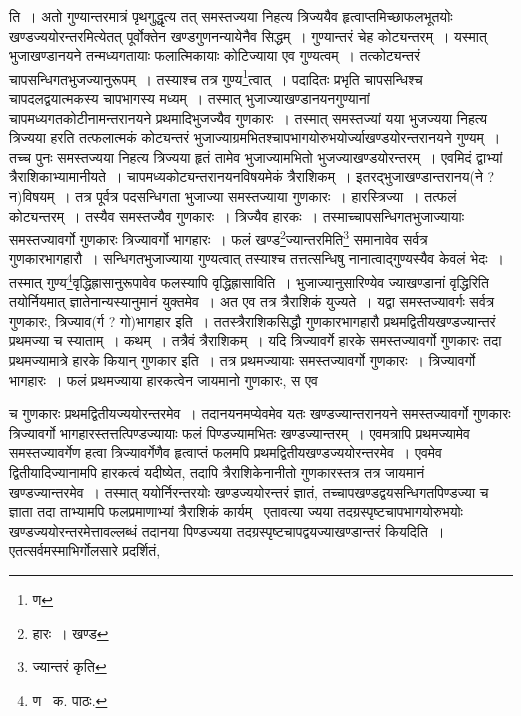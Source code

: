 \documentclass[11pt, openany]{book}
\begin{document}
ति~। अतो गुण्यान्तरमात्रं पृथगुद्धृत्य तत् समस्तज्यया निहत्य त्रिज्ययैव हृत्वाप्तमिच्छाफलभूतयोः खण्डज्ययोरन्तरमित्येतत् पूर्वोक्तेन खण्डगुणनन्यायेनैव सिद्धम्~। गुण्यान्तरं चेह कोट्यन्तरम्~। यस्मात् भुजाखण्डानयने तन्मध्यगतायाः फलात्मिकायाः कोटिज्याया एव गुण्यत्वम्~। तत्कोट्यन्तरं चापसन्धिगतभुजज्यानुरूपम्~। तस्याश्च तत्र गुण्य\renewcommand{\thefootnote}{१}\footnote{ण}त्वात्~। पदादितः प्रभृति चापसन्धिश्च चापदलद्वयात्मकस्य चापभागस्य मध्यम्~। तस्मात् भुजाज्याखण्डानयनगुण्यानां चापमध्यगतकोटीनामन्तरानयने प्रथमादिभुजज्यैव गुणकारः~। तस्मात् समस्तज्यां यया भुजज्यया निहत्य त्रिज्यया हरति तत्फलात्मकं कोट्यन्तरं भुजाज्याग्रमभितश्चापभागयोरुभयोर्ज्याखण्डयोरन्तरानयने गुण्यम्~। तच्च पुनः समस्तज्यया निहत्य त्रिज्यया हृतं तामेव भुजाज्यामभितो भुजज्याखण्डयोरन्तरम्~। एवमिदं द्वाभ्यां त्रैराशिकाभ्यामानीयते~। चापमध्यकोट्यन्तरानयनविषयमेकं त्रैराशिकम्~। इतरद्भुजाखण्डान्तरानय(ने ? न)विषयम्~। तत्र पूर्वत्र पदसन्धिगता भुजाज्या समस्तज्याया गुणकारः~। हारस्त्रिज्या~। तत्फलं कोट्यन्तरम्~। तस्यैव समस्तज्यैव गुणकारः~। त्रिज्यैव हारकः~। तस्माच्चापसन्धिगतभुजाज्यायाः समस्तज्यावर्गो गुणकारः त्रिज्यावर्गो भागहारः~। फलं खण्ड\renewcommand{\thefootnote}{२}\footnote{हारः~। खण्ड}ज्यान्तरमिति\renewcommand{\thefootnote}{३}\footnote{ज्यान्तरं कृति} समानावेव सर्वत्र गुणकारभागहारौ~। सन्धिगतभुजाज्याया गुण्यत्वात् तस्याश्च तत्तत्सन्धिषु नानात्वाद्गुण्यस्यैव केवलं भेदः~। तस्मात् गुण्य\renewcommand{\thefootnote}{४}\footnote{ण \textendash\ क. पाठः.}वृद्धिह्रासानुरूपावेव फलस्यापि वृद्धिह्रासाविति~। भुजाज्यानुसारिण्येव
ज्याखण्डानां वृद्धिरिति तयोर्नियमात् ज्ञातेनान्यस्यानुमानं युक्तमेव~। अत एव तत्र त्रैराशिकं युज्यते~। यद्वा समस्तज्यावर्गः सर्वत्र गुणकारः,
त्रिज्याव(र्ग ? गो)भागहार इति~। ततस्त्रैराशिकसिद्धौ गुणकारभागहारौ प्रथमद्वितीयखण्डज्यान्तरं प्रथमज्या च स्याताम्~। कथम्~। तत्रैवं त्रैराशिकम्~। यदि त्रिज्यावर्गे हारके समस्तज्यावर्गो गुणकारः तदा प्रथमज्यामात्रे हारके कियान् गुणकार इति~। तत्र प्रथमज्यायाः समस्तज्यावर्गो गुणकारः~। त्रिज्यावर्गो भागहारः~। फलं प्रथमज्याया हारकत्वेन जायमानो गुणकारः, स एव 


\newpage

\noindent च गुणकारः प्रथमद्वितीयज्ययोरन्तरमेव~। तदानयनमप्येवमेव यतः खण्डज्यान्तरानयने समस्तज्यावर्गो गुणकारः त्रिज्यावर्गो भागहारस्तत्तत्पिण्डज्यायाः फलं पिण्डज्यामभितः खण्डज्यान्तरम्~। एवमत्रापि प्रथमज्यामेव समस्तज्यावर्गेण हत्वा त्रिज्यावर्गेणैव हृत्वाप्तं फलमपि
प्रथमद्वितीयखण्डज्ययोरन्तरमेव~। एवमेव द्वितीयादिज्यानामपि हारकत्वं यदीष्येत, तदापि त्रैराशिकेनानीतो गुणकारस्तत्र तत्र जायमानं खण्डज्यान्तरमेव~। तस्मात् ययोर्निरन्तरयोः खण्डज्ययोरन्तरं ज्ञातं, तच्चापखण्डद्वयसन्धिगतपिण्डज्या च ज्ञाता तदा ताभ्यामपि फलप्रमाणाभ्यां त्रैराशिकं कार्यम् \textendash\ एतावत्या ज्यया तदग्रस्पृष्टचापभागयोरुभयोः खण्डज्ययोरन्तरमेत्तावल्लब्धं तदानया पिण्डज्यया तदग्रस्पृष्टचापद्वयज्याखण्डान्तरं कियदिति~। एतत्सर्वमस्माभिर्गोलसारे प्रदर्शितं, 
\end{document}

